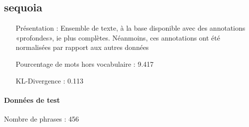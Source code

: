 \subsection{sequoia } 
 \begin{itemize} 
 \item[Présentation :] Ensemble de texte, à la base disponible avec des annotations «profondes», ie plus complètes. Néanmoins, ces annotations ont été normalisées par rapport aux autres données

 \item[Pourcentage de mots hors vocabulaire : ]9.417
 \item[KL-Divergence :]0.113
 \end{itemize}  \paragraph{Données de test \\ }  
 Nombre de phrases : 456\\ 
